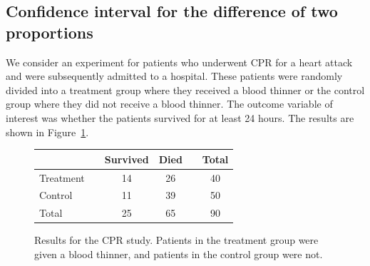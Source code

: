 \subsection[Confidence interval for $p_1 -p_2$]{Confidence interval for the difference of two proportions}

We consider an experiment for patients who underwent CPR for a heart attack and were subsequently admitted to a hospital. These patients were randomly divided into a treatment group where they received a blood thinner or the control group where they did not receive a blood thinner. The outcome variable of interest was whether the patients survived for at least 24 hours.
    The results are shown in  Figure~\ref{resultsForCPRStudyInSmallSampleSection}.

\begin{figure}[ht]
\centering
\begin{tabular}{lccccc}
\hline
			&& Survived 	& Died 	&& Total \\
\hline
Treatment		&& 14		& 26		&& 40 \\
Control		&& 11		& 39		&& 50 \\

\hline
Total			&& 25		& 65		&& 90 \\
\hline
\end{tabular}
\caption{Results for the CPR study.
    Patients in the treatment group were given
    a blood thinner, and patients in the control
    group were not.}
\label{resultsForCPRStudyInSmallSampleSection}
\end{figure}


